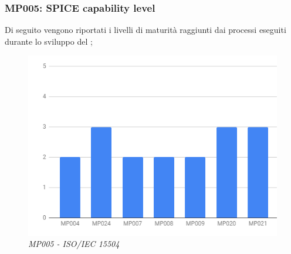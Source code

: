 \subsubsection{MP005: SPICE capability level}
Di seguito vengono riportati i livelli di maturità raggiunti dai processi eseguiti durante lo sviluppo del ;
\begin{figure} [h]
    \centering
	\includegraphics[scale=0.5]{./images/15504.PNG}
    \caption{\textit{MP005 - ISO/IEC 15504 }}\label{}
\end{figure}

